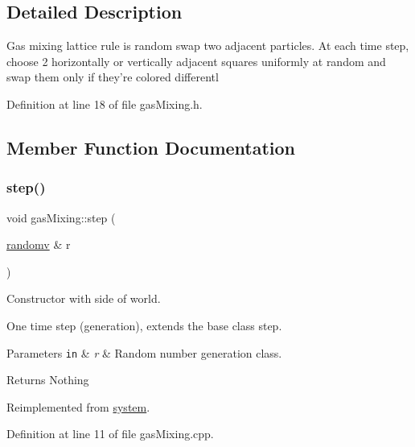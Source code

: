 \subsection{Detailed Description}
Gas mixing lattice rule is random swap two adjacent particles. At each time step, choose 2 horizontally or vertically adjacent squares uniformly at random and swap them only if they’re colored differentl 

Definition at line 18 of file gas\+Mixing.\+h.



\subsection{Member Function Documentation}
\mbox{\label{classgas_mixing_acfd89f15487611dd77da9664642a06c6}} 
\subsubsection{\texorpdfstring{step()}{step()}}
{\footnotesize\ttfamily void gas\+Mixing\+::step (\begin{DoxyParamCaption}\item[{\hyperlink{classrandomv}{randomv} \&}]{r }\end{DoxyParamCaption})\hspace{0.3cm}{\ttfamily [virtual]}}



Constructor with side of world. 

One time step (generation), extends the base class step. 
\begin{DoxyParams}[1]{Parameters}
\mbox{\tt in}  & {\em r} & Random number generation class. \\
\hline
\end{DoxyParams}
\begin{DoxyReturn}{Returns}
Nothing 
\end{DoxyReturn}


Reimplemented from \hyperlink{classsystem_aab28302f43e7ee42da51eb723f091533}{system}.



Definition at line 11 of file gas\+Mixing.\+cpp.

\mbox{\label{classgas_mixing_a99a14c1a13ee0ba938f4c1e22ad491b6}} 
